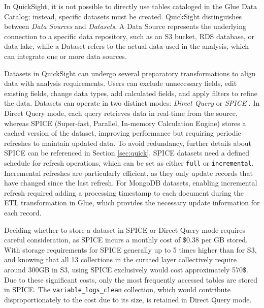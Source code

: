 In QuickSight, it is not possible to directly use tables cataloged in the Glue Data Catalog; instead, specific datasets must be created. QuickSight distinguishes between \textit{Data Sources} and \textit{Datasets}. A Data Source represents the underlying connection to a specific data repository, such as an \ac{S3} bucket, \ac{RDS} database, or data lake, while a Dataset refers to the actual data used in the analysis, which can integrate one or more data sources. %

Datasets in QuickSight can undergo several preparatory transformations to align data with analysis requirements. Users can exclude unnecessary fields, edit existing fields, change data types, add calculated fields, and apply filters to refine the data. Datasets can operate in two distinct modes: \textit{Direct Query} or \textit{SPICE} \cite{spice}. In Direct Query mode, each query retrieves data in real-time from the source, whereas SPICE (Super-fast, Parallel, In-memory Calculation Engine) stores a cached version of the dataset, improving performance but requiring periodic refreshes to maintain updated data. To avoid redundancy, further details about SPICE can be referenced in Section \ref{sec:quick}. SPICE datasets need a defined schedule for refresh operations, which can be set as either \texttt{full} or \texttt{incremental}. Incremental refreshes are particularly efficient, as they only update records that have changed since the last refresh. For MongoDB datasets, enabling incremental refresh required adding a processing timestamp to each document during the \ac{ETL} transformation in Glue, which provides the necessary update information for each record.

Deciding whether to store a dataset in SPICE or Direct Query mode requires careful consideration, as SPICE incurs a monthly cost of \$0.38 per GB stored. With storage requirements for SPICE generally up to 5 times higher than for \ac{S3}, and knowing that all 13 collections in the curated layer collectively require around 300GB in \ac{S3}, using SPICE exclusively would cost approximately 570\$. Due to these significant costs, only the most frequently accessed tables are stored in SPICE. The \texttt{variable\_logs\_clean} collection, which would contribute disproportionately to the cost due to its size, is retained in Direct Query mode.


